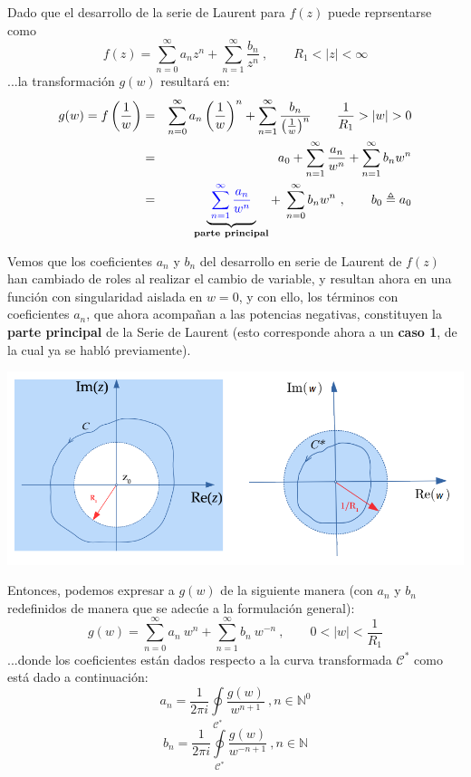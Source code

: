 \documentclass[12pt]{article}
\theoremstyle{definition}
\theoremstyle{theorem}
\theoremstyle{corolary}
\theoremstyle{method}
\begin{document}
Dado que el desarrollo de la serie de Laurent para $f(z)$ puede reprsentarse como
$$f(z) = \sum\limits_{n=0}^{\infty}a_nz^n + \sum\limits_{n=1}^{\infty}\frac{b_n}{z^n}\ ,\qquad R_1<|z|<\infty$$
...la transformaci\'on $g(w)$ resultar\'a en:
\begin{eqnarray*}
g(w) = f\left(\frac{1}{w}\right) &=& \sum\limits_{n=0}^{\infty}a_n \left(\frac{1}{w}\right)^n + \sum\limits_{n=1}^{\infty}\frac{b_n}{ \left(\frac{1}{w}\right)^n}\qquad \frac{1}{R_1}>|w|>0 \\
&=& a_0 + \sum\limits_{n=1}^{\infty} \frac{a_n}{w^n} + \sum\limits_{n=1}^{\infty}b_n w^n \\
&=& \underbrace{\ \color{blue} \sum\limits_{n=1}^{\infty} \frac{a_n}{w^n}\ }_{\mathbf{parte\ principal}} +\; \sum\limits_{n=0}^{\infty}b_n w^n\ ,\qquad b_0 \triangleq a_0
\end{eqnarray*}

Vemos que los coeficientes $a_n$ y $b_n$ del desarrollo en serie de Laurent de $f(z)$ han cambiado de roles al realizar el cambio de variable, y resultan ahora en una funci\'on con singularidad aislada en $w=0$, y con ello, los t\'erminos con coeficientes $a_n$, que ahora acompa\~nan a las potencias negativas, constituyen la \textbf{parte principal} de la Serie de Laurent (esto corresponde ahora a un \textbf{caso 1}, de la cual ya se habl\'o previamente).

\begin{center}
	\includegraphics[scale=0.65]{inverse.png}
\end{center}

Entonces, podemos expresar a $g(w)$ de la siguiente manera (con $a_n$ y $b_n$ redefinidos de manera que se adec\'ue a la formulaci\'on general): $$g(w)=\sum\limits_{n=0}^{\infty} a_n\ w^n + \sum\limits_{n=1}^{\infty}b_n\ w^{-n}\ ,\qquad0<|w|<\frac{1}{R_1}$$
...donde los coeficientes est\'an dados respecto a la curva transformada $\mathcal{C}^*$ como est\'a dado a continuaci\'on: $$a_n=\frac{1}{2\pi i}\oint\limits_{\mathcal{C^*}}\frac{g(w)}{w^{n+1}}\ ,n\in \mathbb{N}^0$$
$$b_n = \frac{1}{2\pi i}\oint\limits_{\mathcal{C^*}}\frac{g(w)}{w^{-n+1}}\ ,n\in \mathbb{N}$$
\end{document}
